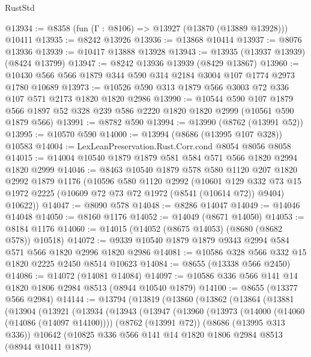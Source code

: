 \begin{lexlean}{RustStd}
\begin{coremodule}
@13934 := @8358 (fun (Γ : @8106) => @13927 (@13870 (@13889 @13928))) @10411
@13935 := @8242 @13926
@13936 := @13868 @10414
@13937 := @8076 @13936
@13939 := @10417 @13888 @13928
@13943 := @13935 (@13937 @13939) (@8424 @13799)
@13947 := @8242 @13936 @13939 (@8429 @13867)
@13960 := @10430 @566 @566 @1879 @344 @590 @314 @2184 @3004 @107 @1774 @2973 @1780 @10689
@13973 := @10526 @590 @313 @1879 @566 @3003 @72 @336 @107 @571 @2173 @1820 @1820 @2986
@13990 := @10544
    @590
    @107
    @1879
    @566
    @1897
    @52
    @328
    @239
    @586
    @2220
    @1820
    @1820
    @2999
    (@10561 @590 @1879 @566)
@13991 := @8782 @590
@13994 := @13990 (@8762 (@13991 @52))
@13995 := @10570 @590
@14000 := @13994 (@8686 (@13995 @107 @328)) @10583
@14004 := LexLeanPreservation.Rust.Corr.cond @8054 @8056 @8058
@14015 := @14004 @10540 @1879 @1879 @581 @584 @571 @566 @1820 @2994 @1820 @2999
@14046 := @8463
    @10540
    @1879
    @578
    @580
    @1120
    @207
    @1820
    @2992
    @1879
    @1176
    (@10596
      @580
      @1120
      @2992
      (@10601
        @129
        @332
        @73
        @15
        @1972
        @2225
        (@10609 @72 @73 @72 @1972 (@8541 (@10614 @72)) @9404)
        @10622))
@14047 := @8090 @578
@14048 := @8286 @14047
@14049 := @14046 @14048
@14050 := @8160 @1176
@14052 := @14049 (@8671 @14050)
@14053 := @8184 @1176
@14060 := @14015 (@14052 (@8675 @14053) (@8680 (@8682 @578)) @10518)
@14072 := @9339 @10540 @1879 @1879 @9343 @2994 @584 @571 @566 @1820 @2996 @1820 @2986
@14081 := @10586 @328 @566 @332 @15 @1820 @2225 @2450 @8514 @10623
@14084 := @8655 (@13338 @566 @2450)
@14086 := @14072 (@14081 @14084)
@14097 := @10586 @336 @566 @141 @14 @1820 @1806 @2984 @8513 (@8944 @10540 @1879)
@14100 := @8655 (@13377 @566 @2984)
@14144 := @13794
    (@13819
      (@13860
        (@13862
          (@13864
            (@13881
              (@13904
                (@13921
                  (@13934
                    (@13943
                      (@13947
                        (@13960
                          (@13973
                            (@14000 (@14060 (@14086 (@14097 @14100))))
                            (@8762 (@13991 @72))
                            (@8686 (@13995 @313 @336))
                            @10642
                            (@10825
                              @336
                              @566
                              @141
                              @14
                              @1820
                              @1806
                              @2984
                              @8513
                              (@8944 @10411 @1879)

\end{coremodule}
\end{lexlean}

